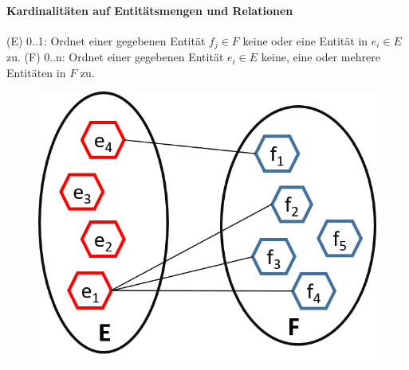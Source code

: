 \begin{frame}{\insertsection}
\framesubtitle{Kardinalitäten auf Entit\"atsmengen und Relationen}
\newline 
(E) 0..1: Ordnet einer gegebenen Entit\"at $f_j \in F$ keine oder eine Entit\"at in $e_i\in E$ zu. 
\newline 
(F) 0..n: Ordnet einer gegebenen Entit\"at $e_i \in E$ keine, eine oder mehrere Entit\"aten in $F$ zu. 
\begin{figure}
	\includegraphics[scale=0.5]{img/ERM-1-n-Relation.png}
\end{figure}
\end{frame}

